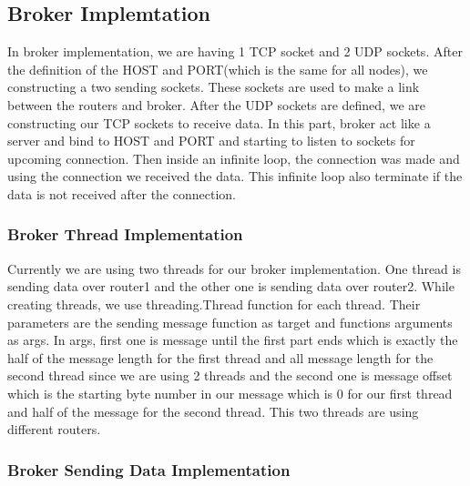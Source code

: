 \documentclass[conference]{IEEEtran}
\begin{document}
\subsection{Broker Implemtation}

In broker implementation, we are having 1 TCP socket and 2 UDP sockets. After the definition of the HOST and PORT(which is the same for all nodes), we constructing a two sending sockets. These sockets are used to make a link between the routers and broker. After the UDP sockets are defined, we are constructing our TCP sockets to receive data. In this part, broker act like a server and bind to HOST and PORT and starting to listen to sockets for upcoming connection. Then inside an infinite loop, the connection was made and using the connection we received the data. This infinite loop also terminate if the data is not received after the connection.

\subsubsection{Broker Thread Implementation}

Currently we are using two threads for our broker implementation. One thread is sending data over router1 and the other one is sending data over router2. While creating threads, we use threading.Thread function for each thread. Their parameters are the sending message function as target and functions arguments as args. In args, first one is message until the first part ends which is exactly the half of the message length for the first thread and all message length for the second thread since we are using 2 threads and the second one is message offset which is the starting byte number in our message which is 0 for our first thread and half of the message for the second thread. This two threads are using different routers.


\subsubsection{Broker Sending Data Implementation}
\end{document}
